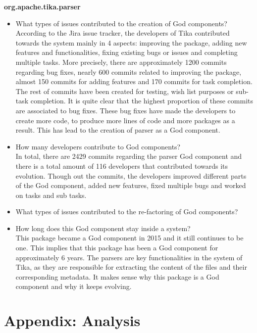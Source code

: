 \documentclass{article}
\begin{document}
\textbf{org.apache.tika.parser}
\begin{itemize}
    \item What types of issues contributed to the creation of God components? \\
    According to the Jira issue tracker, the developers of Tika contributed towards the system mainly in 4 aspects: improving the package, adding new features and functionalities, fixing existing bugs or issues and completing multiple tasks. More precisely, there are approximately 1200 commits regarding bug fixes, nearly 600 commits related to improving the package, almost 150 commits for adding features and 170 commits for task completion. The rest of commits have been created for testing, wish list purposes or sub-task completion. It is quite clear that the highest proportion of these commits are associated to bug fixes. These bug fixes have made the developers to create more code, to produce more lines of code and more packages as a result. This has lead to the creation of parser as a God component. 
    \item How many developers contribute to God components?\\ In total, there are 2429 commits regarding the parser God component and there is a total amount of 116 developers that contributed towards its evolution. Though out the commits, the developers improved different parts of the God component, added new features, fixed multiple bugs and worked on tasks and sub tasks.  
     \item What types of issues contributed to the re-factoring of God components?\\
    \item How long does this God component stay inside a system?\\ This package became a God component in 2015 and it still continues to be one. This implies that this package has been a God component for approximately 6 years. The parsers are key functionalities in the system of Tika, as they are responsible for extracting the content of the files and their corresponding metadata. It makes sense why this package is a God component and why it keeps evolving.

\end{itemize}



\appendix
\section{Appendix: Analysis}
\end{document}
